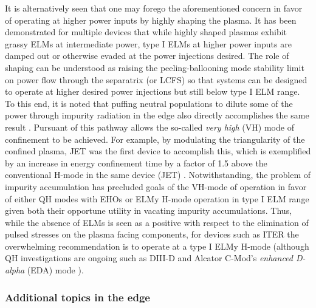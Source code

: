 \documentclass[11pt,titlepage]{report}
\begin{document}
It is alternatively seen that one may forego the aforementioned concern in favor of operating at higher power inputs by highly shaping the plasma. It has been demonstrated for multiple devices that while highly shaped plasmas exhibit grassy ELMs at intermediate power, type I ELMs at higher power inputs are damped out or otherwise evaded at the power injections desired. The role of shaping can be understood as raising the peeling-ballooning mode stability limit on power flow through the separatrix (or LCFS) so that systems can be designed to operate at higher desired power injections but still below type I ELM range. To this end, it is noted that puffing neutral populations to dilute some of the power through impurity radiation in the edge also directly accomplishes the same result \cite{Zohm}.  Pursuant of this pathway allows the so-called \emph{very high} (VH) mode of confinement to be achieved. For example, by modulating the triangularity of the confined plasma, JET was the first device to accomplish this,  which is exemplified by an increase in energy confinement time by a factor of 1.5 above the conventional H-mode in the same device (JET) \cite{Jackson91}. Notwithstanding, the problem of impurity accumulation has precluded goals of the VH-mode of operation in favor of either QH modes with EHOs or ELMy H-mode operation in type I ELM range given both their opportune utility in vacating impurity accumulations. Thus, while the absence of ELMs is seen as a positive with respect to the elimination of pulsed stresses on the plasma facing components, for devices such as ITER the overwhelming recommendation is to operate at a type I ELMy H-mode (although QH investigations are ongoing such as DIII-D and Alcator C-Mod's \emph{enhanced D-alpha} (EDA) mode \cite{ConnorXX}). 



\subsubsection{Additional topics in the edge}
\end{document}
